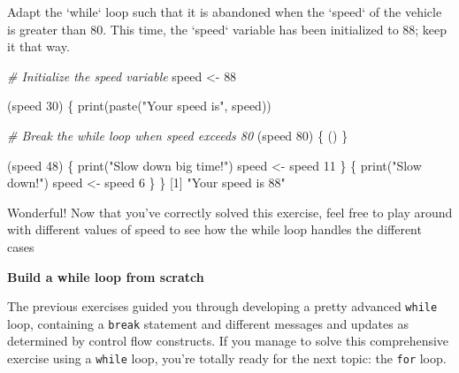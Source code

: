 \documentclass[]{article}
\newcommand{\hlnum}[1]{\textcolor[rgb]{0.816,0.125,0.439}{#1}}%
\newcommand{\hlstr}[1]{\textcolor[rgb]{0.251,0.627,0.251}{#1}}%
\newcommand{\hlcom}[1]{\textcolor[rgb]{0.502,0.502,0.502}{\textit{#1}}}%
\newcommand{\hlstd}[1]{\textcolor[rgb]{0.251,0.251,0.251}{#1}}%
\newcommand{\hlkwc}[1]{\textcolor[rgb]{0.251,0.251,0.251}{#1}}%
\newcommand{\hlkwd}[1]{\textcolor[rgb]{0.878,0.439,0.125}{#1}}%
\newenvironment{Shaded}{\begin{myshaded}}{\end{myshaded}}
\newcommand{\KeywordTok}[1]{\hlkwd{#1}}
\newcommand{\DataTypeTok}[1]{\hlkwc{#1}}
\newcommand{\DecValTok}[1]{\hlnum{#1}}
\newcommand{\StringTok}[1]{\hlstr{#1}}
\newcommand{\CommentTok}[1]{\hlcom{#1}}
\newcommand{\NormalTok}[1]{\hlstd{#1}}
\begin{document}
\begin{Shaded}
\begin{Highlighting}[]
\NormalTok{Adapt the }\StringTok{`}\DataTypeTok{while}\StringTok{`}\NormalTok{ loop such that it is abandoned when the }\StringTok{`}\DataTypeTok{speed}\StringTok{`}\NormalTok{ of the vehicle is greater than }\DecValTok{80}\NormalTok{. This time, the }\StringTok{`}\DataTypeTok{speed}\StringTok{`}\NormalTok{ variable has been initialized to }\DecValTok{88}\NormalTok{; keep it that way.}
\end{Highlighting}
\end{Shaded}

\begin{Shaded}
\begin{Highlighting}[]
\CommentTok{# Initialize the speed variable}
\NormalTok{speed <-}\StringTok{ }\DecValTok{88}

\NormalTok{ (speed }\OperatorTok{>}\StringTok{ }\DecValTok{30}\NormalTok{) \{}
\KeywordTok{print}\NormalTok{(}\KeywordTok{paste}\NormalTok{(}\StringTok{"Your speed is"}\NormalTok{, speed))}

\CommentTok{# Break the while loop when speed exceeds 80}
\NormalTok{ (speed }\OperatorTok{>}\StringTok{ }\DecValTok{80}\NormalTok{) \{}
\NormalTok{()}
\NormalTok{\}}

\NormalTok{ (speed }\OperatorTok{>}\StringTok{ }\DecValTok{48}\NormalTok{) \{}
\KeywordTok{print}\NormalTok{(}\StringTok{"Slow down big time!"}\NormalTok{)}
\NormalTok{speed <-}\StringTok{ }\NormalTok{speed }\OperatorTok{-}\StringTok{ }\DecValTok{11}
\NormalTok{\} }\NormalTok{ \{}
\KeywordTok{print}\NormalTok{(}\StringTok{"Slow down!"}\NormalTok{)}
\NormalTok{speed <-}\StringTok{ }\NormalTok{speed }\OperatorTok{-}\StringTok{ }\DecValTok{6}
\NormalTok{\}}
\NormalTok{\}}
\NormalTok{   [}\DecValTok{1}\NormalTok{] }\StringTok{"Your speed is 88"}
\end{Highlighting}
\end{Shaded}

Wonderful! Now that you've correctly solved this exercise, feel free to
play around with different values of speed to see how the while loop
handles the different cases

\textbf{Build a while loop from scratch}

The previous exercises guided you through developing a pretty advanced
\texttt{while} loop, containing a \texttt{break} statement and different
messages and updates as determined by control flow constructs. If you
manage to solve this comprehensive exercise using a \texttt{while} loop,
you're totally ready for the next topic: the \texttt{for} loop.
\end{document}
